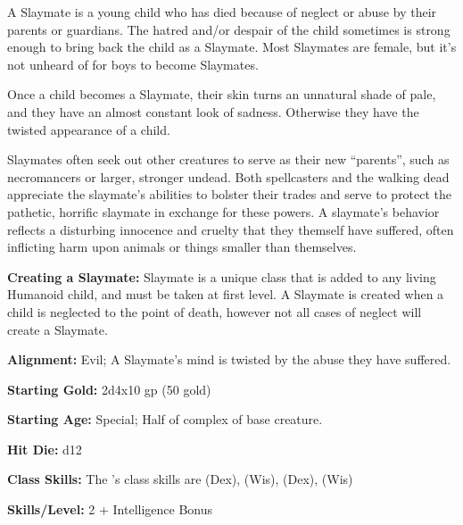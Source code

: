 
A Slaymate is a young child who has died because of neglect or abuse by their parents or guardians. The hatred and/or despair of the child sometimes is strong enough to bring back the child as a Slaymate. Most Slaymates are female, but it's not unheard of for boys to become Slaymates.

Once a child becomes a Slaymate, their skin turns an unnatural shade of pale, and they have an almost constant look of sadness. Otherwise they have the twisted appearance of a child.

Slaymates often seek out other creatures to serve as their new “parents”, such as necromancers or larger, stronger undead. Both spellcasters and the walking dead appreciate the slaymate’s abilities to bolster their trades and serve to protect the pathetic, horrific slaymate in exchange for these powers. A slaymate’s behavior reflects a disturbing innocence and cruelty that they themself have suffered, often inflicting harm upon animals or things smaller than themselves.

\textbf{Creating a Slaymate:} Slaymate is a unique class that is added to any living Humanoid child, and must be taken at first level. A Slaymate is created when a child is neglected to the point of death, however not all cases of neglect will create a Slaymate.

\textbf{Alignment:} Evil; A Slaymate's mind is twisted by the abuse they have suffered.

\textbf{Starting Gold:} 2d4x10 gp (50 gold)

\textbf{Starting Age:} Special; Half of complex of base creature.

\textbf{Hit Die:} d12

\textbf{Class Skills:} The \currentclassname{}'s class skills are  (Dex),  (Wis),  (Dex),  (Wis)

\textbf{Skills/Level:} 2 + Intelligence Bonus

\poorbab{}
\poorfor{}
\poorref{}
\goodwil{}

\begin{classtable}
\end{classtable}

\classfeatures

